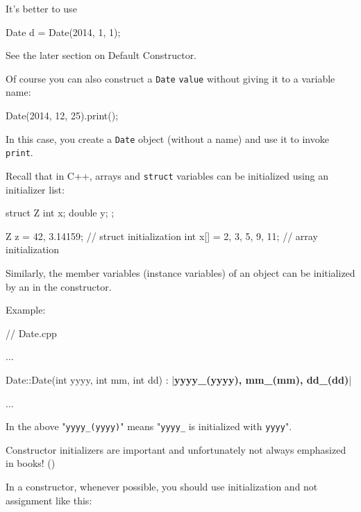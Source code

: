 It's better to use

\begin{consolethree}[escapeinside=||]
Date d = Date(2014, 1, 1);
\end{consolethree}

See the later section on Default Constructor.

Of course you can also construct a \texttt{Date} \texttt{value} without
giving it to a variable name:

\begin{consolethree}[escapeinside=||]
Date(2014, 12, 25).print();
\end{consolethree}

In this case, you create a \texttt{Date} object (without a name) and use
it to invoke \texttt{print}.




\newpage{}

Recall that in C++, arrays and \texttt{struct} variables can be
initialized using an initializer list:

\begin{consolethree}[escapeinside=||]
struct Z
{
    int x;
    double y;
};

Z z = {42, 3.14159}; // struct initialization
int x[] = {2, 3, 5, 9, 11}; // array initialization
\end{consolethree}

Similarly, the member variables (instance variables) of an object can be
initialized by an  in the constructor.

Example:

\begin{consolethree}[escapeinside=||]
// Date.cpp

...

Date::Date(int yyyy, int mm, int dd)
        : |\textbf{yyyy\_(yyyy), mm\_(mm), dd\_(dd)}|
{}

...
\end{consolethree}

In the above "\texttt{yyyy\_(yyyy)}" means "\texttt{yyyy\_} is initialized
with \texttt{yyyy}".

Constructor initializers are important and unfortunately not always
emphasized in books! ()

In a constructor, whenever possible, you should use initialization and
not assignment like this:

